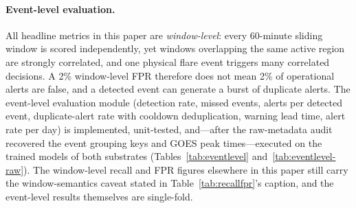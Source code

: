 \paragraph{Event-level evaluation.}
All headline metrics in this paper are \emph{window-level}: every
60-minute sliding window is scored independently, yet windows
overlapping the same active region are strongly correlated, and one
physical flare event triggers many correlated decisions. A 2\%
window-level FPR therefore does not mean 2\% of operational alerts
are false, and a detected event can generate a burst of duplicate
alerts. The event-level evaluation module (detection rate, missed
events, alerts per detected event, duplicate-alert rate with cooldown
deduplication, warning lead time, alert rate per day) is implemented,
unit-tested, and---after the raw-metadata audit recovered the event
grouping keys and GOES peak times---executed on the trained models of
both substrates (Tables~\ref{tab:eventlevel}
and~\ref{tab:eventlevel-raw}). The window-level recall and FPR
figures elsewhere in this paper still carry the window-semantics
caveat stated in Table~\ref{tab:recallfpr}'s caption, and the
event-level results themselves are single-fold.

